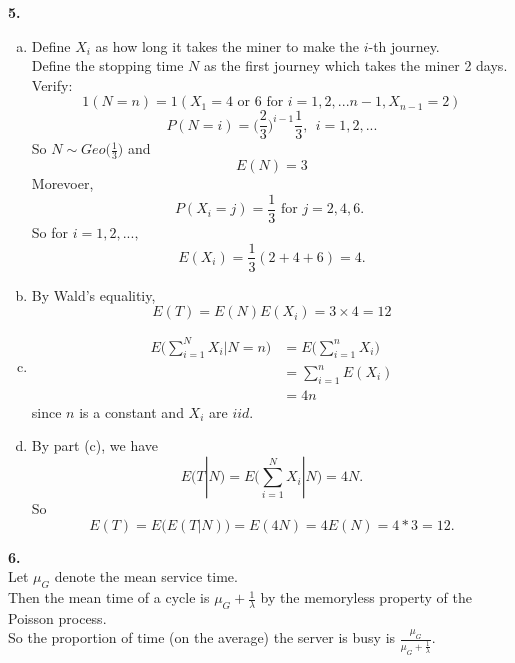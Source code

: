 \documentclass{amsart}
\theoremstyle{plain}
\theoremstyle{definition}
\begin{document}
\vspace{5mm}

\noindent \textbf{5.} 
\begin{enumerate}[(a)]
	\item
		Define $X_i$ as how long it takes the miner to make the $i$-th journey. \\
		Define the stopping time $N$ as the first journey which takes the miner 2 days.\\ 
		Verify: 
		\[1(N=n) = 1(X_1 = 4\text{ or }6 \text{ for } i = 1,2,...n-1, X_{n-1} = 2)	\]		 
		\[P(N=i) = \Big({\frac{2}{3}}\Big)^{i-1}\frac{1}{3},\ \ i = 1,2,...\]
		So $N\sim Geo\Big(\frac{1}{3}\Big)$ and  
		\[E(N) = 3\]
		Morevoer,
		\[ P(X_i = j) = \frac{1}{3}\text{ for $j=2,4,6$. } \]
		So for $i=1,2,...,$
		\[E(X_i) = \frac{1}{3}(2+4+6) = 4.\]
	\item
		By Wald's equalitiy,
		\[ E(T)  = E(N)E(X_i) = 3\times 4 = 12\]
	\item
		\begin{align*}
			E\Bigg(\sum_{i=1}^NX_i|N=n\Bigg) &= E\Bigg(\sum_{i=1}^nX_i\Bigg )\\
											 &=\sum_{i=1}^nE(X_i)\\
											 &=4n
		\end{align*}
		since $n$ is a constant and $X_i$ are $iid$.\\
	\item
		By part (c), we have 
		\[E(T|N) = E\Bigg(\sum_{i=1}^NX_i|N\Bigg) =4N.\]
		So
		\[ E(T)= E\big(E(T|N)\big) = E(4N) = 4E(N) = 4*3 = 12. \]
\end{enumerate}

\vspace{5mm}

\noindent \textbf{6.} \\
Let $\mu_G$ denote the mean service time.\\
Then the mean time of a cycle is $\mu_G + \frac{1}{\lambda}$ by the memoryless property of the Poisson process.\\
So the proportion of time (on the average) the server is busy is $\frac{\mu_G}{\mu_G + \frac{1}{\lambda}}$.
\end{document}
